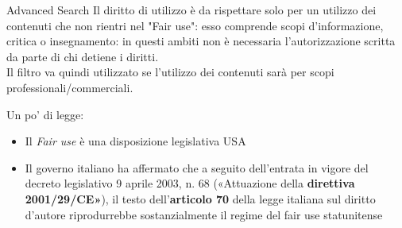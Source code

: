 \documentclass{beamer}
\begin{document}
\begin{frame}{Advanced Search}
Il diritto di utilizzo è da rispettare solo per un utilizzo dei contenuti che non rientri nel "Fair use": esso comprende scopi d'informazione, critica o insegnamento: in questi ambiti non è necessaria l'autorizzazione scritta da parte di chi detiene i diritti. \\
Il filtro va quindi utilizzato se l'utilizzo dei contenuti sarà per scopi professionali/commerciali.\\
\footnotesize 
\begin{block}{Un po' di legge:}
\begin{itemize}
\item Il \textit{Fair use} è una disposizione legislativa USA
\item Il governo italiano ha affermato che a seguito dell'entrata in vigore del decreto legislativo 9 aprile 2003, n. 68 («Attuazione della \textbf{direttiva 2001/29/CE»}), il testo dell'\textbf{articolo 70} della legge italiana sul diritto d'autore riprodurrebbe sostanzialmente il regime del fair use statunitense
\end{itemize}
\end{block}
\end{frame}
\end{document}
